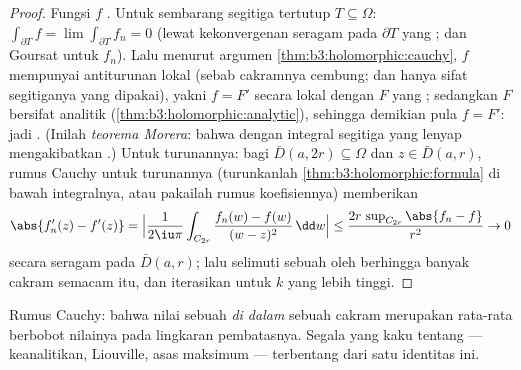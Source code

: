 \begin{proof}
Fungsi $f$ . Untuk sembarang segitiga tertutup $T \subseteq
\Omega$: $\int_{\partial T}f = \lim\int_{\partial T}f_n = 0$
(lewat kekonvergenan seragam pada $\partial T$ yang ; dan Goursat untuk
$f_n$). Lalu menurut argumen \cref{thm:b3:holomorphic:cauchy},
$f$ mempunyai antiturunan lokal (sebab cakramnya cembung; dan hanya sifat
segitiganya yang dipakai), yakni $f = F'$ secara lokal dengan $F$ yang
; sedangkan $F$ bersifat analitik
(\cref{thm:b3:holomorphic:analytic}), sehingga demikian pula $f = F'$:
jadi . (Inilah \emph{teorema
Morera}: bahwa  dengan integral
segitiga yang lenyap mengakibatkan .) Untuk turunannya: bagi
$\bar D(a, 2r) \subseteq \Omega$ dan $z \in \bar D(a, r)$,
rumus Cauchy untuk turunannya (turunkanlah
\cref{thm:b3:holomorphic:formula} di bawah integralnya, atau pakailah
rumus koefisiennya) memberikan
\[
\abs{f_n'(z) - f'(z)} =
\Bigl|\frac{1}{2\iu\pi}\int_{C_{2r}}\frac{f_n(w) - f(w)}{(w -
z)^2}\,\dd w\Bigr|
\leq \frac{2r\,\sup_{C_{2r}}\abs{f_n - f}}{r^2} \to 0
\]
secara seragam pada $\bar D(a,r)$; lalu selimuti sebuah  oleh berhingga banyak
cakram semacam itu, dan iterasikan untuk $k$ yang lebih tinggi.
\end{proof}

\begin{omfigure}

{\small Rumus Cauchy: bahwa nilai sebuah 
\emph{di dalam} sebuah cakram merupakan rata-rata berbobot nilainya pada
lingkaran pembatasnya. Segala yang kaku tentang  ---
keanalitikan, Liouville, asas maksimum --- terbentang dari
satu identitas ini.}
\end{omfigure}

